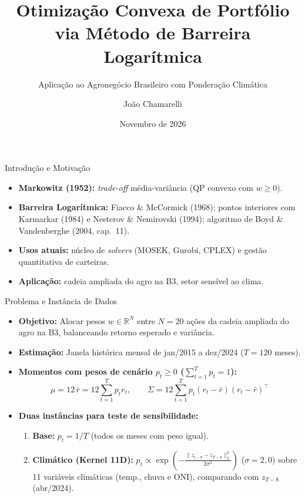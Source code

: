 \documentclass[aspectratio=43]{beamer}
\title[Otimização de Portfólio via Barreira Logarítmica]{Otimização Convexa de Portfólio via Método de Barreira Logarítmica}
\subtitle{Aplicação ao Agronegócio Brasileiro com Ponderação Climática}
\author{João Chamarelli}
\institute[UFRJ / COS360]{Disciplina: COS360 -- Otimização \\ Universidade Federal do Rio de Janeiro}
\date{Novembro de 2026}
\begin{document}
\begin{frame}
  \titlepage
\end{frame}

\begin{frame}{Introdução e Motivação}
  \begin{itemize}
    \item \textbf{Markowitz (1952):} \emph{trade-off} média-variância (QP convexo com $w \ge 0$).
    \item \textbf{Barreira Logarítmica:} Fiacco \& McCormick (1968); pontos interiores com Karmarkar (1984) e Nesterov \& Nemirovski (1994); algoritmo de Boyd \& Vandenberghe (2004, cap.~11).
    \item \textbf{Usos atuais:} núcleo de \emph{solvers} (MOSEK, Gurobi, CPLEX) e gestão quantitativa de carteiras.
    \item \textbf{Aplicação:} cadeia ampliada do agro na B3, setor sensível ao clima.
  \end{itemize}
\end{frame}

\begin{frame}{Problema e Instância de Dados}
  \begin{itemize}
    \item \textbf{Objetivo:} Alocar pesos $w \in \mathbb{R}^N$ entre $N = 20$ ações da cadeia ampliada do agro na B3, balanceando retorno esperado e variância.
    \item \textbf{Estimação:} Janela histórica mensal de jan/2015 a dez/2024 ($T = 120$ meses).
    \item \textbf{Momentos com pesos de cenário $p_t \ge 0$ ($\sum_{t=1}^T p_t = 1$):}
    \[
      \mu = 12\,\bar{r} = 12\sum_{t=1}^T p_t r_t, \qquad
      \Sigma = 12\sum_{t=1}^T p_t (r_t - \bar{r})(r_t - \bar{r})^\top
    \]
    \item \textbf{Duas instâncias para teste de sensibilidade:}
    \begin{enumerate}
      \item \textbf{Base:} $p_t = 1/T$ (todos os meses com peso igual).
      \item \textbf{Climático (Kernel 11D):} $p_t \propto \exp\!\left(-\frac{\|z_{t-8} - z_{T-8}\|_2^2}{2\sigma^2}\right)$ ($\sigma = 2{,}0$) sobre 11 variáveis climáticas (temp., chuva e ONI), comparando com $z_{T-8}$ (abr/2024).
    \end{enumerate}
  \end{itemize}
\end{frame}
\end{document}
